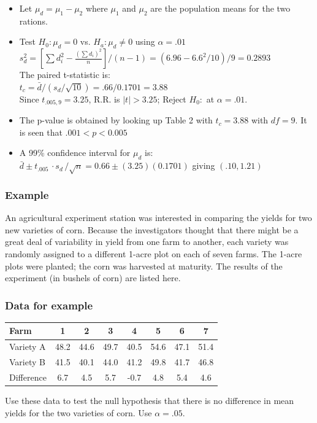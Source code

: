 \documentclass[xcolor=dvipsnames,12pt]{beamer}
\begin{document}
\begin{frame}
\begin{itemize}
\item Let $\mu_d=\mu_1-\mu_2$ where $\mu_1$ and $\mu_2$ are the population means for the two rations.\\[.01in]
\item Test $H_0: \mu_d = 0$ vs. $H_a: \mu_d \neq 0$ using $\alpha=.01$\\[.01in]
 $s_d^2 = [\sum{d_i^2} - \frac{(\sum{d_i})^2}{n}]/(n-1)=(6.96-6.6^2/10)/9 = 0.2893$\\[.1in]
 The paired t-statistic is:\\[.1in]
$t_c = \bar{d}/(s_d/\sqrt{10}) = .66/0.1701= 3.88$\\[.1in]
  Since $t_{.005,9} = 3.25$, R.R. is $|t|> 3.25$; Reject $H_0:$ at $\alpha=.01$.\\[.1in]
\item The p-value is obtained by looking up Table 2 with $t_c=3.88$
with $df=9$. It is seen that  $.001<p< 0.005$ \\[.1in]
\item  A 99\% confidence interval for $\mu_d $ is: \\[.1in]
 $\bar{d} \pm  t_{.005} \, \cdot s_d \, /\sqrt{n}  = 0.66  \pm 
(3.25)(0.1701)$ giving  $(.10, 1.21)$
\end{itemize}
\end{frame}

%
%
%

\begin{frame}
\frametitle{Example}
 An agricultural experiment station was interested in
comparing the yields for two new varieties of corn.  Because the
investigators thought that there might be a great deal of
variability in yield from one farm to another, each variety was
randomly assigned to a different 1-acre plot on each of seven
farms.  The 1-acre plots were planted; the corn was harvested at
maturity.  The results of the experiment (in bushels of corn) are
listed here.
\end{frame}

\begin{frame}
\frametitle{Data for example}
\begin{center}
\begin{tabular}{lccccccc}
Farm & 1 & 2 & 3 & 4 & 5 & 6 & 7 \\ \hline
Variety A & 48.2 & 44.6 & 49.7 & 40.5 & 54.6 & 47.1 & 51.4 \\ 
Variety B & 41.5 & 40.1 & 44.0 & 41.2 & 49.8 & 41.7 & 46.8 \\ \hline
Difference & 6.7 & 4.5 & 5.7 & -0.7 & 4.8 & 5.4  & 4.6
\end{tabular}
\end{center}
 Use these data to test the null hypothesis that there is no
difference in mean yields for the two varieties of corn.  Use $\alpha=.05$.
\end{frame}
\end{document}

